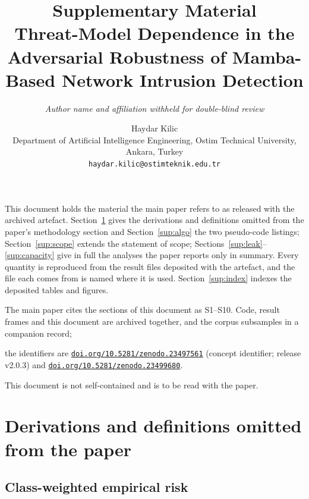\documentclass[11pt,a4paper]{article}
\title{Supplementary Material\\[2pt]
\large Threat-Model Dependence in the Adversarial Robustness of
Mamba-Based Network Intrusion Detection}
\author{\normalsize \textit{Author name and affiliation withheld for
double-blind review}}
\author{Haydar Kilic\\[2pt]
\normalsize Department of Artificial Intelligence Engineering,
Ostim Technical University, Ankara, Turkey\\
\normalsize \texttt{haydar.kilic@ostimteknik.edu.tr}}
\date{}
\newif\ifANONYMOUS
\begin{document}
\maketitle
\vspace{-2.5em}

\noindent
This document holds the material the main paper refers to as released
with the archived artefact. Section~\ref{sup:deriv} gives the
derivations and definitions omitted from the paper's methodology
section and Section~\ref{sup:algo} the two pseudo-code listings;
Section~\ref{sup:scope} extends the statement of scope;
Sections~\ref{sup:leak}--\ref{sup:capacity} give in full the analyses
the paper reports only in summary. Every quantity is reproduced from
the result files deposited with the artefact, and the file each comes
from is named where it is used. Section~\ref{sup:index} indexes the
deposited tables and figures.

\medskip\noindent
The main paper cites the sections of this document as S1--S10. Code,
result frames and this document are archived together, and the corpus
subsamples in a companion record;
\ifANONYMOUS
both identifiers are withheld for double-blind review.
\else
the identifiers are
\href{https://doi.org/10.5281/zenodo.23497561}{\nolinkurl{doi.org/10.5281/zenodo.23497561}}
(concept identifier; release v2.0.3) and
\href{https://doi.org/10.5281/zenodo.23499680}{\nolinkurl{doi.org/10.5281/zenodo.23499680}}.
\fi
This document is not self-contained and is to be read with the paper.

\tableofcontents

\section{Derivations and definitions omitted from the paper}
\label{sup:deriv}

\subsection{Class-weighted empirical risk}
\end{document}
